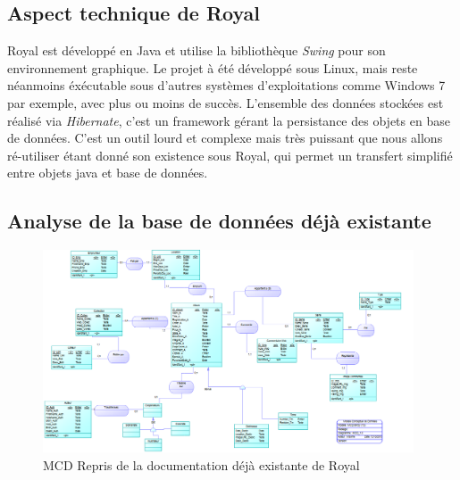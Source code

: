 \subsection{Aspect technique de Royal}
Royal est développé en Java et utilise la bibliothèque \emph{Swing} pour son environnement graphique. 
Le projet à été développé sous Linux, mais reste néanmoins éxécutable sous d'autres systèmes d'exploitations comme Windows 7 par exemple, avec plus ou moins de succès. 
L'ensemble des données stockées est réalisé via \emph{Hibernate}, c'est un framework gérant la persistance des objets en base de données. 
C'est un outil lourd et complexe mais très puissant que nous allons ré-utiliser étant donné son existence sous Royal, qui permet un transfert simplifié entre objets java et base de données.

\subsection{Analyse de la base de données déjà existante}
\begin{figure}[h]
\begin{center}
 \includegraphics[height=6cm]{../img/MCD_Royal.png}
\end{center}
\caption{MCD Repris de la documentation déjà existante de Royal}
\end{figure}
